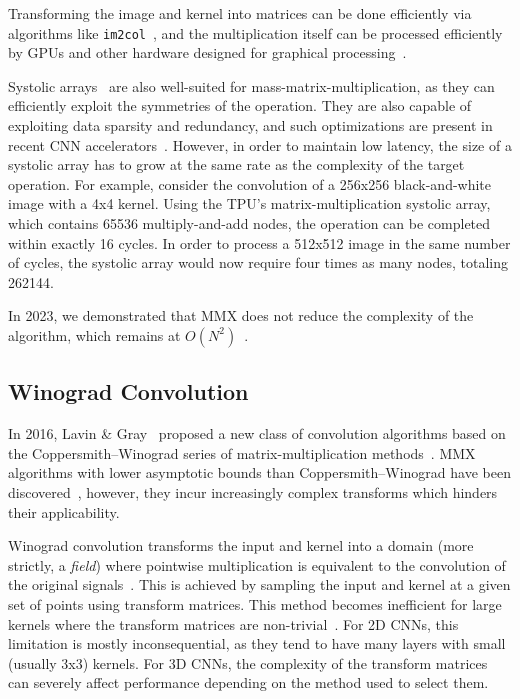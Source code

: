 Transforming the image and kernel into matrices can be done efficiently via algorithms like \texttt{im2col}~\cite{jouppi2020domain}, and the multiplication itself can be processed efficiently by GPUs and other hardware designed for graphical processing~\cite{zhou2021characterizing}.

Systolic arrays~\cite{kung1979systolic} are also well-suited for mass-matrix-multiplication, as they can efficiently exploit the symmetries of the operation. They are also capable of exploiting data sparsity and redundancy, and such optimizations are present in recent CNN accelerators~\cite{jiang2021optimized,fan2021high}. However, in order to maintain low latency, the size of a systolic array has to grow at the same rate as the complexity of the target operation. For example, consider the convolution of a 256x256 black-and-white image with a 4x4 kernel. Using the TPU's matrix-multiplication systolic array, which contains 65536 multiply-and-add nodes, the operation can be completed within exactly 16 cycles. In order to process a 512x512 image in the same number of cycles, the systolic array would now require four times as many nodes, totaling 262144. 

In 2023, we demonstrated that MMX does not reduce the complexity of the algorithm, which remains at $O(N^2)$~\cite{lera2023hardware}.

\subsection{Winograd Convolution}
In 2016, Lavin \& Gray~\cite{lavin2016fast} proposed a new class of convolution algorithms based on the Coppersmith–Winograd series of matrix-multiplication methods~\cite{coppersmith1982asymptotic}. MMX algorithms with lower asymptotic bounds than Coppersmith–Winograd have been discovered~\cite{karstadt2020matrix,schwartz2023pebbling}, however, they incur increasingly complex transforms which hinders their applicability.

Winograd convolution transforms the input and kernel into a domain (more strictly, a \textit{field}) where pointwise multiplication is equivalent to the convolution of the original signals~\cite{lavin2016fast}. This is achieved by sampling the input and kernel at a given set of points using transform matrices. This method becomes inefficient for large kernels where the transform matrices are non-trivial~\cite{alam2022winograd}. For 2D CNNs, this limitation is mostly inconsequential, as they tend to have many layers with small (usually 3x3) kernels. For 3D CNNs, the complexity of the transform matrices can severely affect performance depending on the method used to select them.

